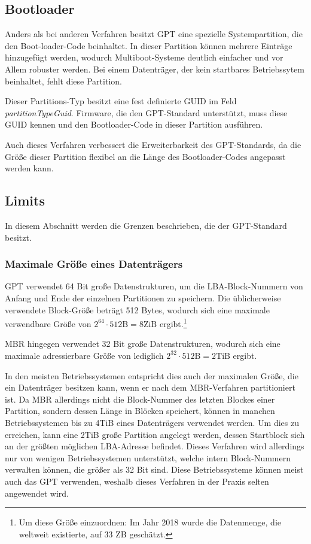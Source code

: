 \subsection{Bootloader}
\label{sec:gpt:bootloader}

Anders als bei anderen Verfahren besitzt GPT eine spezielle Systempartition, die den Boot-loader-Code beinhaltet.
In dieser Partition können mehrere Einträge hinzugefügt werden, wodurch Multiboot-Systeme deutlich einfacher und vor Allem robuster werden.\cite{heise-mbr-gpt}
Bei einem Datenträger, der kein startbares Betriebssytem beinhaltet, fehlt diese Partition.

Dieser Partitions-Typ besitzt eine fest definierte GUID im Feld \textit{partitionTypeGuid}.
Firmware, die den GPT-Standard unterstützt, muss diese GUID kennen und den Bootloader-Code in dieser Partition ausführen.

Auch dieses Verfahren verbessert die Erweiterbarkeit des GPT-Standards, da die Größe dieser Partition flexibel an die Länge des Bootloader-Codes angepasst werden kann.


\subsection{Limits}
In diesem Abschnitt werden die Grenzen beschrieben, die der GPT-Standard besitzt.

\subsubsection{Maximale Größe eines Datenträgers}
\label{sec:gpt:limits:max-partition-size}

GPT verwendet 64 Bit große Datenstrukturen, um die LBA-Block-Nummern von Anfang und Ende der einzelnen Partitionen zu speichern.
Die üblicherweise verwendete Block-Größe beträgt 512 Bytes, wodurch sich eine maximale verwendbare Größe von $ 2^{64} \cdot 512 \mathrm{B} = 8 \mathrm{ZiB} $ ergibt.\footnote{
    Um diese Größe einzuordnen: Im Jahr 2018 wurde die Datenmenge, die weltweit existierte, auf 33 ZB geschätzt.\cite{global-datasphere-estimate}
}

MBR hingegen verwendet 32 Bit große Datenstrukturen, wodurch sich eine maximale adressierbare Größe von lediglich $ 2^{32} \cdot 512 \mathrm{B} = 2 \mathrm{TiB} $ ergibt.

In den meisten Betriebssystemen entspricht dies auch der maximalen Größe, die ein Datenträger besitzen kann, wenn er nach dem MBR-Verfahren partitioniert ist.
Da MBR allerdings nicht die Block-Nummer des letzten Blockes einer Partition, sondern dessen Länge in Blöcken speichert, können in manchen Betriebssystemen bis zu 4TiB eines Datenträgers verwendet werden. 
Um dies zu erreichen, kann eine 2TiB große Partition angelegt werden, dessen Startblock sich an der größten möglichen LBA-Adresse befindet.
Dieses Verfahren wird allerdings nur von wenigen Betriebssystemen unterstützt, welche intern Block-Nummern verwalten können, die größer als 32 Bit sind.
Diese Betriebssysteme können meist auch das GPT verwenden, weshalb dieses Verfahren in der Praxis selten angewendet wird.\cite{mbr-4tb-workaround}

